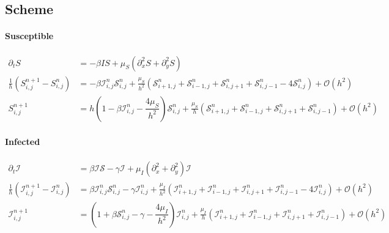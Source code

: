 \subsection{Scheme}

\paragraph{Susceptible}

\begin{align*}
  \partial_t S                                        & = -\beta IS + \mu_S \left(\partial_x^2 S + \partial_y^2 S\right)                                                                                                                                                                       \\
  \frac{1}{h}\left(S_{i, j}^{n+1} - S_{i, j}^n\right) & =  - \beta \mathcal{I}_{i,j}^n \mathcal{S}_{i,j}^n +  \frac{\mu_S}{h^2} \left(\mathcal{S}_{i+1,j}^n + \mathcal{S}_{i-1,j}^n + \mathcal{S}_{i,j+1}^n + \mathcal{S}_{i,j-1}^n - 4\mathcal{S}_{i,j}^n\right) + \mathcal{O}(h^2)           \\
  S_{i,j}^{n+1}                                       & = h \left(1 - \beta\mathcal{I}_{i,j}^n - \dfrac{4\mu_S}{h^2}\right)\mathcal{S}_{i,j}^n + \frac{\mu_S}{h} \left(\mathcal{S}_{i+1,j}^n + \mathcal{S}_{i-1,j}^n + \mathcal{S}_{i,j+1}^n + \mathcal{S}_{i,j-1}^n\right) + \mathcal{O}(h^2)
\end{align*}



\clearpage
\paragraph{Infected}
\noindent
\begin{align*}
  \partial_t \mathcal{I}                                                & = \beta \mathcal{I}\mathcal{S} - \gamma \mathcal{I} + \mu_I \left(\partial_x^2 + \partial_y^2\right)\mathcal{I}                                                                                                                                      \\
  \frac{1}{h}\left(\mathcal{I}_{i,j}^{n+1} - \mathcal{I}_{i,j}^n\right) & = \beta \mathcal{I}_{i,j}^n \mathcal{S}_{i,j}^n - \gamma \mathcal{I}_{i,j}^n + \frac{\mu_I}{h^2}\left(\mathcal{I}_{i+1,j}^n + \mathcal{I}_{i-1,j}^n + \mathcal{I}_{i,j+1}^n + \mathcal{I}_{i,j-1}^n - 4\mathcal{I}_{i,j}^n\right) + \mathcal{O}(h^2) \\
  \mathcal{I}_{i,j}^{n+1}                                               & = \left(1 + \beta\mathcal{S}_{i,j}^n - \gamma - \dfrac{4\mu_I}{h^2}\right)\mathcal{I}_{i,j}^n + \frac{\mu_I}{h}\left(\mathcal{I}_{i+1,j}^n + \mathcal{I}_{i-1,j}^n + \mathcal{I}_{i,j+1}^n + \mathcal{I}_{i,j-1}^n\right) + \mathcal{O}(h^2)
\end{align*}

